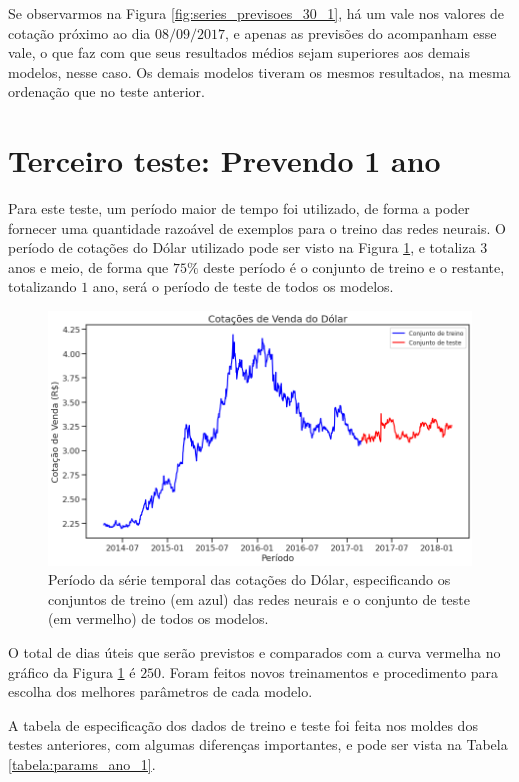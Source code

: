 Se observarmos na Figura \ref{fig:series_previsoes_30_1}, há um vale nos valores de cotação próximo ao dia $08/09/2017$, e apenas as previsões do  acompanham esse vale, o que faz com que seus resultados médios sejam superiores aos demais modelos, nesse caso. Os demais modelos tiveram os mesmos resultados, na mesma ordenação que no teste anterior.

\section{Terceiro teste: Prevendo 1 ano}

Para este teste, um período maior de tempo foi utilizado, de forma a poder fornecer uma quantidade razoável de exemplos para o treino das redes neurais. O período de cotações do Dólar utilizado pode ser visto na Figura \ref{fig:keras_treino_ano}, e totaliza $3$ anos e meio, de forma que $75\%$ deste período é o conjunto de treino e o restante, totalizando $1$ ano, será o período de teste de todos os modelos.

\begin{figure}[htb]
\centering
\includegraphics[width=14cm]{figuras/keras_treino_ano}
\caption{Período da série temporal das cotações do Dólar, especificando os conjuntos de treino (em azul) das redes neurais e o conjunto de teste (em vermelho) de todos os modelos.}
\label{fig:keras_treino_ano}
\end{figure}

O total de dias úteis que serão previstos e comparados com a curva vermelha no gráfico da Figura \ref{fig:keras_treino_ano} é $250$. Foram feitos novos treinamentos e procedimento para escolha dos melhores parâmetros de cada modelo.

A tabela de especificação dos dados de treino e teste foi feita nos moldes dos testes anteriores, com algumas diferenças importantes, e pode ser vista na Tabela \ref{tabela:params_ano_1}.

